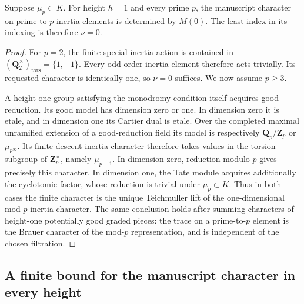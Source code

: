 \begin{proposition}\label{prop:B-RD5}
Suppose $\mu_p\subset K$. For height $h=1$ and every prime $p$, the manuscript
character on prime-to-$p$ inertia elements is determined by $M(0)$.
The least index in its indexing is therefore $\nu=0$.
\end{proposition}
\begin{proof}
For $p=2$, the finite special inertia action is contained in
$(\mathbf Q_2^\times)_{\mathrm{tors}}=\{1,-1\}$. Every odd-order
inertia element therefore acts trivially. Its requested character is
identically one, so $\nu=0$ suffices. We now assume $p\geq3$.

A height-one group satisfying the monodromy condition itself acquires
good reduction. Its good model has dimension zero or one. In dimension
zero it is etale, and in dimension one its Cartier dual is etale.
Over the completed maximal unramified extension of a good-reduction
field its model is respectively $\mathbf Q_p/\mathbf Z_p$ or
$\mu_{p^\infty}$. Its finite descent inertia character therefore takes
values in the torsion subgroup of $\mathbf Z_p^\times$, namely
$\mu_{p-1}$. In dimension zero, reduction modulo $p$ gives precisely
this character. In dimension one, the Tate module acquires additionally
the cyclotomic factor, whose reduction is trivial under $\mu_p\subset K$.
Thus in both cases the finite character is the unique Teichmuller lift
of the one-dimensional mod-$p$ inertia character. The same conclusion
holds after summing characters of height-one potentially good graded
pieces: the trace on a prime-to-$p$ element is the Brauer character of
the mod-$p$ representation, and is independent of the chosen filtration.
\end{proof}


\subsection{A finite bound for the manuscript character in every height}

